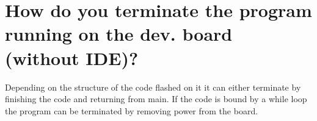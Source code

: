     \section[short]{How do you terminate the program running on the dev. board (without IDE)?}

    Depending on the structure of the code flashed on it it can either terminate by finishing the code and returning from main.
    If the code is bound by a while loop the program can be terminated by removing power from the board.